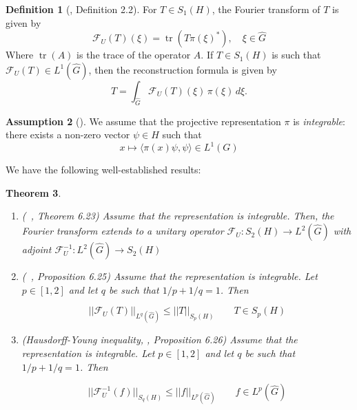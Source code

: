 \documentclass[11pt,a4paper]{article}
\newtheorem{theorem}{Theorem}[section]
\theoremstyle{definition}
\newtheorem{definition}[theorem]{Definition}
\newtheorem{assumption}[theorem]{Assumption}
\newcommand{\F}{\mathcal{F}}
\newcommand{\Ghat}{\widehat{G}}
\newcommand{\ip}[2]{\langle #1, #2 \rangle}
\begin{document}
\begin{definition}[\cite{LakmonMensah2025}, Definition 2.2]
For \( T \in S_1(H) \), the Fourier transform of \( T \) is given by
\begin{equation} \label{eq:fourier_transform}
        \F_U(T)(\xi) = \operatorname{tr}(T \pi(\xi)^*), \quad \xi \in \Ghat
\end{equation}    
Where \( \operatorname{tr}(A) \) is the trace of the operator \( A \). If \( T \in S_1(H) \) is such that \( \F_U(T) \in L^1(\Ghat) \), then the reconstruction formula is given by
    \begin{equation} \label{eq:reconstruction_formula}
        T = \int_{\Ghat} \F_U(T)(\xi) \,\pi (\xi) \, d\xi.
    \end{equation}
\end{definition}

\begin{assumption}[\cite{FulscheGalke2025}]
\label{ass:integrability}
We assume that the projective representation $\pi$ is \emph{integrable}: there exists a non-zero vector $\psi \in H$ such that
$$x \mapsto \ip{\pi(x)\psi}{\psi} \in L^1(G)$$
\end{assumption}

We have the following well-established results:

\begin{theorem}
\label{thm:qft-properties}
\begin{enumerate}
\item (~\cite{FulscheGalke2025}, Theorem 6.23) Assume that the representation is integrable. Then, the Fourier transform extends to a unitary operator $\mathcal{F}_U : S_2(H) \longrightarrow L^2(\Ghat)$ with adjoint $\mathcal{F}^{ -1}_U : L^2(\Ghat) \longrightarrow S_2(H)$

\item (~\cite{FulscheGalke2025}, Proposition 6.25) Assume that the representation is integrable. Let $p \in [1, 2]$ and let $q$ be such that $1/p+1/q =1$. Then

$$||\F_U(T)||_{L^q (\Ghat)} \leq ||T||_{S_p(H)} \qquad T \in S_p(H)$$

\item (Hausdorff-Young inequality, \cite{FulscheGalke2025}, Proposition 6.26) Assume that the representation is integrable. Let $p \in [1, 2]$ and let $q$ be such that $1/p+1/q =1$. Then 

$$ ||\mathcal{F}^{ -1}_U (f)||_{S_q(H)} \leq ||f||_{L^p(\Ghat)} \qquad f \in L^p(\Ghat) $$

\end{enumerate}
\end{theorem}
\end{document}
